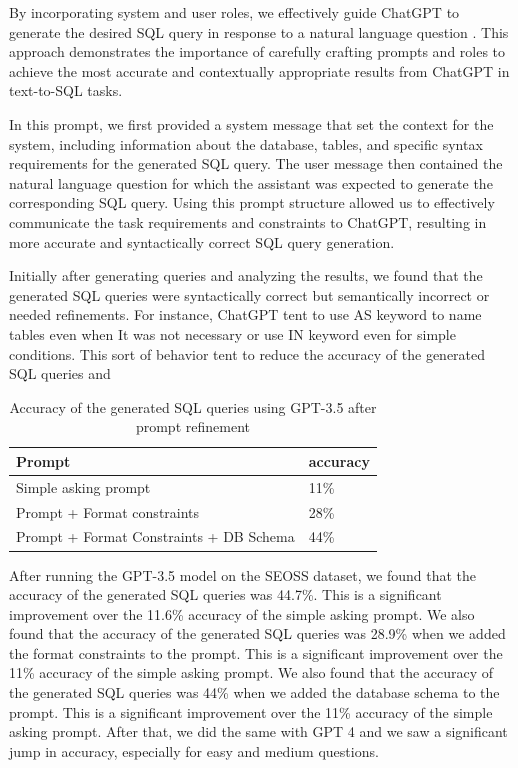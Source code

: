 By incorporating system and user roles, we effectively guide ChatGPT to generate the desired SQL query in response to a natural language question \cite{white2023prompt}. This approach demonstrates the importance of carefully crafting prompts and roles to achieve the most accurate and contextually appropriate results from ChatGPT in text-to-SQL tasks.

In this prompt, we first provided a system message that set the context for the system, including information about the database, tables, and specific syntax requirements for the generated SQL query. The user message then contained the natural language question for which the assistant was expected to generate the corresponding SQL query.
Using this prompt structure allowed us to effectively communicate the task requirements and constraints to ChatGPT, resulting in more accurate and syntactically correct SQL query generation.

Initially after generating queries and analyzing the results, we found that the generated SQL queries were syntactically correct but semantically incorrect or needed refinements. For instance, ChatGPT tent to use AS keyword to name tables even when It was not necessary or use IN keyword even for simple conditions. This sort of behavior tent to reduce the accuracy of the generated SQL queries and

\begin{table}[H]
    \centering
    \begin{tabular}{|l|l|}
        \hline
        \textbf{Prompt}         & \textbf{accuracy} \\ \hline
        Simple asking prompt    & 11\%              \\ \hline
        Prompt + Format constraints & 28\%              \\ \hline
        Prompt + Format Constraints + DB Schema         & 44\%              \\ \hline
    \end{tabular}
    \caption{Accuracy of the generated SQL queries using GPT-3.5 after prompt refinement}
\end{table}

After running the GPT-3.5 model on the SEOSS dataset, we found that the accuracy of the generated SQL queries was 44.7\%. This is a significant improvement over the 11.6\% accuracy of the simple asking prompt. We also found that the accuracy of the generated SQL queries was 28.9\% when we added the format constraints to the prompt. This is a significant improvement over the 11\% accuracy of the simple asking prompt. We also found that the accuracy of the generated SQL queries was 44\% when we added the database schema to the prompt. This is a significant improvement over the 11\% accuracy of the simple asking prompt. After that, we did the same with GPT 4 and we saw a significant jump in accuracy, especially for easy and medium questions.

